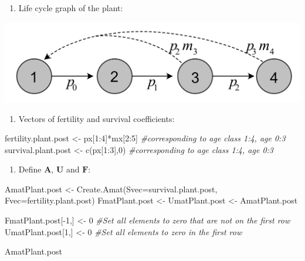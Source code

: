 \documentclass[
]{book}
\newenvironment{Shaded}{\begin{snugshade}}{\end{snugshade}}
\newcommand{\AttributeTok}[1]{\textcolor[rgb]{0.77,0.63,0.00}{#1}}
\newcommand{\CommentTok}[1]{\textcolor[rgb]{0.56,0.35,0.01}{\textit{#1}}}
\newcommand{\DecValTok}[1]{\textcolor[rgb]{0.00,0.00,0.81}{#1}}
\newcommand{\FunctionTok}[1]{\textcolor[rgb]{0.00,0.00,0.00}{#1}}
\newcommand{\NormalTok}[1]{#1}
\newcommand{\OtherTok}[1]{\textcolor[rgb]{0.56,0.35,0.01}{#1}}
\newcommand{\SpecialCharTok}[1]{\textcolor[rgb]{0.00,0.00,0.00}{#1}}
\providecommand{\tightlist}{%
  \setlength{\itemsep}{0pt}\setlength{\parskip}{0pt}}
\begin{document}
\begin{enumerate}
\def\labelenumi{\arabic{enumi}.}
\tightlist
\item
  Life cycle graph of the plant:
\end{enumerate}

\includegraphics[width=0.6\linewidth]{LifeCyclePlantPost}

\begin{enumerate}
\def\labelenumi{\arabic{enumi}.}
\setcounter{enumi}{1}
\tightlist
\item
  Vectors of fertility and survival coefficients:
\end{enumerate}

\begin{Shaded}
\begin{Highlighting}[]
\NormalTok{fertility.plant.post }\OtherTok{\textless{}{-}}\NormalTok{ px[}\DecValTok{1}\SpecialCharTok{:}\DecValTok{4}\NormalTok{]}\SpecialCharTok{*}\NormalTok{mx[}\DecValTok{2}\SpecialCharTok{:}\DecValTok{5}\NormalTok{] }\CommentTok{\#corresponding to age class 1:4, age 0:3}
\NormalTok{survival.plant.post }\OtherTok{\textless{}{-}} \FunctionTok{c}\NormalTok{(px[}\DecValTok{1}\SpecialCharTok{:}\DecValTok{3}\NormalTok{],}\DecValTok{0}\NormalTok{) }\CommentTok{\#corresponding to age class 1:4, age 0:3}
\end{Highlighting}
\end{Shaded}

\begin{enumerate}
\def\labelenumi{\arabic{enumi}.}
\setcounter{enumi}{2}
\tightlist
\item
  Define \(\mathbf{A}\), \(\mathbf{U}\) and \(\mathbf{F}\):
\end{enumerate}

\begin{Shaded}
\begin{Highlighting}[]
\NormalTok{AmatPlant.post }\OtherTok{\textless{}{-}} \FunctionTok{Create.Amat}\NormalTok{(}\AttributeTok{Svec=}\NormalTok{survival.plant.post, }\AttributeTok{Fvec=}\NormalTok{fertility.plant.post)}
\NormalTok{FmatPlant.post }\OtherTok{\textless{}{-}}\NormalTok{ UmatPlant.post }\OtherTok{\textless{}{-}}\NormalTok{ AmatPlant.post}

\NormalTok{FmatPlant.post[}\SpecialCharTok{{-}}\DecValTok{1}\NormalTok{,] }\OtherTok{\textless{}{-}} \DecValTok{0} \CommentTok{\#Set all elements to zero that are not on the first row}
\NormalTok{UmatPlant.post[}\DecValTok{1}\NormalTok{,] }\OtherTok{\textless{}{-}} \DecValTok{0} \CommentTok{\#Set all elements to zero in the first row}

\NormalTok{AmatPlant.post}
\end{Highlighting}
\end{Shaded}
\end{document}
